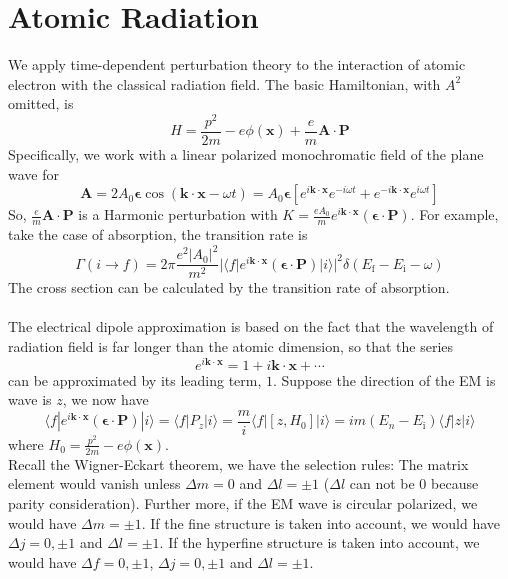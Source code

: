 \section{Atomic Radiation}
We apply time-dependent perturbation theory to the interaction of atomic electron with the classical radiation field.
The basic Hamiltonian, with $A^2$ omitted, is
\[H = \frac{p^2}{2m} - e\phi(\bm{x}) + \frac{e}{m}\bm{A}\cdot\bm{P}\]
Specifically, we work with a linear polarized monochromatic field of the plane wave for
\[\bm{A} = 2A_0\bm{\epsilon}\cos(\bm{k}\cdot\bm{x}-\omega t) = A_0\bm{\epsilon} [e^{i\bm{k}\cdot\bm{x}}e^{-i\omega t}  + e^{-i\bm{k}\cdot\bm{x}}e^{i\omega t} ]\]
So, $\frac{e}{m}\bm{A}\cdot\bm{P}$ is a Harmonic perturbation with $K = \frac{eA_0}{m} e^{i\bm{k}\cdot\bm{x}} (\bm{\epsilon}\cdot\bm{P})$.
For example, take the case of absorption, the transition rate is
\[\Gamma(i \to f) = 2\pi \frac{e^2|A_0|^2}{m^2} |\langle f |e^{i\bm{k}\cdot\bm{x}} (\bm{\epsilon}\cdot\bm{P}) |i \rangle|^2 \delta(E_{\mathrm{f}}-E_{\mathrm{i}}-\omega)\]
The cross section can be calculated by the transition rate of absorption.\\ \\
The electrical dipole approximation is based on the fact that the wavelength of radiation field is far longer than the atomic dimension, so that the series
\[e^{i\bm{k}\cdot\bm{x}} = 1+ i\bm{k}\cdot\bm{x}+\cdots\]
can be approximated by its leading term, $1$. Suppose the direction of the EM is wave is $z$, we now have
\[\langle f |e^{i\bm{k}\cdot\bm{x}} (\bm{\epsilon}\cdot\bm{P}) |i \rangle = \langle f | P_z |i \rangle = \frac{m}{i} \langle f |  [z,H_0] |i \rangle = im(E_n-E_{\mathrm{i}})\langle f | z |i \rangle  \]
where $H_0 = \frac{p^2}{2m} - e\phi(\bm{x})$.\\
Recall the Wigner-Eckart theorem, we have the selection rules: The matrix element would vanish unless $\Delta m = 0$ and $\Delta l = \pm 1$ ($\Delta l $ can not be $0$ because parity consideration). Further more, if the EM wave is circular polarized, we would have $\Delta m = \pm 1$. If the fine structure is taken into account, we would have $\Delta j = 0,\pm 1$ and $\Delta l = \pm 1$. If the hyperfine structure is taken into account, we would have $\Delta f = 0,\pm 1$, $\Delta j = 0,\pm 1$ and $\Delta l = \pm 1$. 

